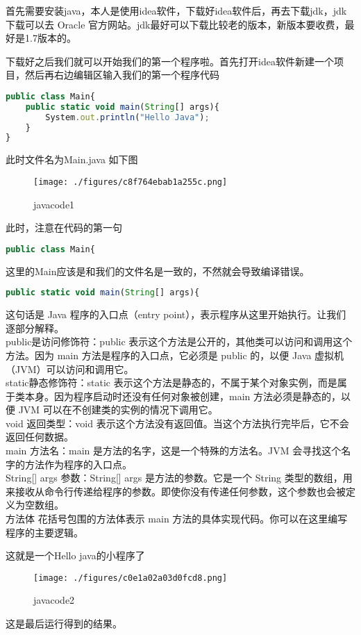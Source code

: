 

首先需要安装java，本人是使用idea软件，下载好idea软件后，再去下载jdk，jdk下载可以去 Oracle 官方网站。jdk最好可以下载比较老的版本，新版本要收费，最好是1.7版本的。

下载好之后我们就可以开始我们的第一个程序啦。首先打开idea软件新建一个项目，然后再右边编辑区输入我们的第一个程序代码
\begin{lstlisting}[language=js]
public class Main{
    public static void main(String[] args){
        System.out.println("Hello Java");
    }
}
\end{lstlisting}
此时文件名为Main.java
如下图\begin{figure}[ht]
\centering
\texttt{[image: ./figures/c8f764ebab1a255c.png]}
\caption{javacode1} \label{fig_java_1}
\end{figure}
此时，注意在代码的第一句
\begin{lstlisting}[language=js]
public class Main{
\end{lstlisting}
这里的Main应该是和我们的文件名是一致的，不然就会导致编译错误。
\begin{lstlisting}[language=js]
 public static void main(String[] args){
\end{lstlisting}

这句话是 Java 程序的入口点（entry point），表示程序从这里开始执行。让我们逐部分解释。\\
public是访问修饰符：public 表示这个方法是公开的，其他类可以访问和调用这个方法。因为 main 方法是程序的入口点，它必须是 public 的，以便 Java 虚拟机（JVM）可以访问和调用它。
\\
static静态修饰符：static 表示这个方法是静态的，不属于某个对象实例，而是属于类本身。因为程序启动时还没有任何对象被创建，main 方法必须是静态的，以便 JVM 可以在不创建类的实例的情况下调用它。\\
void
返回类型：void 表示这个方法没有返回值。当这个方法执行完毕后，它不会返回任何数据。\\
main
方法名：main 是方法的名字，这是一个特殊的方法名。JVM 会寻找这个名字的方法作为程序的入口点。\\
String[] args
参数：String[] args 是方法的参数。它是一个 String 类型的数组，用来接收从命令行传递给程序的参数。即使你没有传递任何参数，这个参数也会被定义为空数组。\\
方法体
{ } 花括号包围的方法体表示 main 方法的具体实现代码。你可以在这里编写程序的主要逻辑。

这就是一个Hello java的小程序了\begin{figure}[ht]
\centering
\texttt{[image: ./figures/c0e1a02a03d0fcd8.png]}
\caption{javacode2} \label{fig_java_2}
\end{figure}
这是最后运行得到的结果。